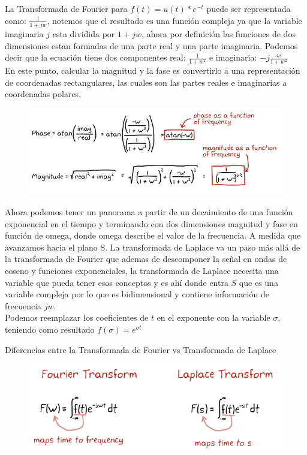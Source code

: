 \documentclass[
	12pt, %
]{fphw}
\begin{document}
La Transformada de Fourier para $f(t)=u(t)*e^{-t}$ puede ser representada como: $\frac{1}{1+jw}$, notemos que el resultado es una función compleja ya que la variable imaginaria $j$ esta dividida por $1+jw$, ahora por definición las funciones de dos dimensiones estan formadas de una parte real y una parte imaginaria. Podemos decir que la ecuación tiene dos componentes real: $\frac{1}{1+w^{2}}$ e imaginaria: $-j\frac{w}{1+w^{2}}$ \\

En este punto, calcular la magnitud y la fase es convertirlo a una representación de coordenadas rectangulares, las cuales son las partes reales e imaginarias a coordenadas polares.

\begin{figure}[H]
  \centering
  \includegraphics[scale=0.4]{images/funciones.png}
\end{figure}

Ahora podemos tener un panorama a partir de un decaimiento de una función exponencial en el tiempo y terminando con dos dimensiones magnitud y fase en función de omega, donde omega describe el valor de la frecuencia. A medida que avanzamos hacia el plano S. La transformada de Laplace va un paso más allá de la transformada de Fourier que ademas de descomponer la señal en ondas de coseno y funciones exponenciales, la transformada de Laplace necesita una variable que pueda tener esos conceptos y es ahí donde entra $S$ que es una variable compleja por lo que es bidimensional y contiene información de frecuencia $jw$.\\

Podemos reemplazar los coeficientes de $t$ en el exponente con la variable $\sigma$, teniendo como resultado $f(\sigma)=e^{\sigma t}$

Diferencias entre la Transformada de Fourier vs Transformada de Laplace
\begin{figure}[H]
  \centering
  \includegraphics[scale=0.5]{images/fourier_laplace.png}
\end{figure}
\end{document}
